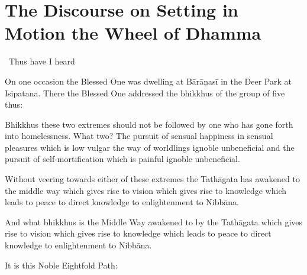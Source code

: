\section{The Discourse on Setting in Motion the Wheel of Dhamma}
\label{wheel-of-dhamma-full}

\begin{leader-english}
  \anglebracketleft\ \hspace{-0.5mm}Thus have I heard \hspace{-0.5mm}\anglebracketright\
\end{leader-english}

\smallskip

\begin{english-hang}
  On one occasion the Blessed One was dwelling at Bārāṇasī in the Deer Park at Isipatana. There the Blessed One addressed the bhikkhus of the group of five thus:
\end{english-hang}

\medskip

\begin{english-hang}
  Bhikkhus these two extremes should not be followed by one who has gone forth into homelessness. What two? The pursuit of sensual happiness in sensual pleasures which is low vulgar the way of worldlings ignoble unbeneficial and the pursuit of self-mortification which is painful ignoble unbeneficial.
\end{english-hang}

\medskip

\begin{english-hang}
  Without veering towards either of these extremes the Tathāgata has awakened to the middle way which gives rise to vision which gives rise to knowledge which leads to peace to direct knowledge to enlightenment to Nibbāna.
\end{english-hang}

\medskip

\begin{english-hang}
  And what bhikkhus is the Middle Way awakened to by the Tathāgata which gives rise to vision which gives rise to knowledge which leads to peace to direct knowledge to enlightenment to Nibbāna.
\end{english-hang}

\medskip

\begin{english-hang}
  It is this Noble Eightfold Path:
\end{english-hang}

